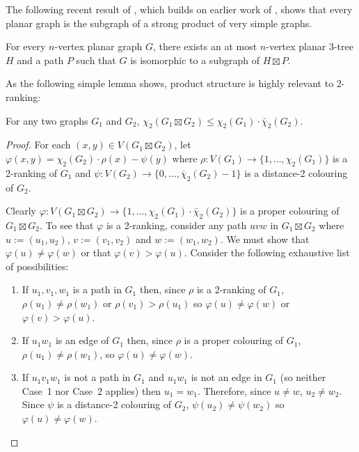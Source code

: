 \documentclass[kpfonts]{patmorin}
\newcommand{\trn}{\chi_2}
\newcommand{\dtcn}{\bar{\chi}_2}
\theoremstyle{named}
\begin{document}
The following recent result of \citet{dujmovic.joret.ea:planar}, which builds on earlier work of \citet{pilipczuk.siebertz:polynomial}, shows that every planar graph is the subgraph of a strong product of very simple graphs.

\begin{thm}\cite{dujmovic.joret.ea:planar}\label{product-structure}
    For every $n$-vertex planar graph $G$, there exists an at most $n$-vertex planar 3-tree $H$ and a path $P$ such that $G$ is isomorphic to a subgraph of $H\boxtimes P$.
\end{thm}

As the following simple lemma shows, product structure is highly relevant to 2-ranking:

\begin{lem}\label{product-lemma}
    For any two graphs $G_1$ and $G_2$, $\trn(G_1\boxtimes G_2)\le \trn(G_1)\cdot\dtcn(G_2)$.
\end{lem}

\begin{proof}
    For each $(x,y)\in V(G_1\boxtimes G_2)$, let $\varphi(x,y)=\trn(G_2)\cdot \rho(x) - \psi(y)$ where $\rho:V(G_1)\to\{1,\ldots,\trn(G_1)\}$ is a 2-ranking of $G_1$ and $\psi:V(G_2)\to\{0,\ldots,\dtcn(G_2)-1\}$ is a distance-2 colouring of $G_2$.

    Clearly $\varphi:V(G_1\boxtimes G_2)\to \{1,\ldots,\trn(G_1)\cdot\dtcn(G_2)\}$ is a proper colouring of $G_1\boxtimes G_2$.  To see that $\varphi$ is a 2-ranking, consider any path $uvw$ in $G_1\boxtimes G_2$ where $u:=(u_1,u_2)$, $v:=(v_1,v_2)$ and $w:=(w_1,w_2)$.  We must show that $\varphi(u)\neq\varphi(w)$ or that $\varphi(v)>\varphi(u)$.  Consider the following exhaustive list of possibilities:
    \begin{enumerate}
        \item If $u_1,v_1,w_1$ is a path in $G_1$ then, since $\rho$ is a 2-ranking of $G_1$, $\rho(u_1)\neq\rho(w_1)$ or $\rho(v_1)>\rho(u_1)$ so $\varphi(u)\neq \varphi(w)$ or $\varphi(v)>\varphi(u)$.

        \item If $u_1w_1$ is an edge of $G_1$ then, since $\rho$ is a proper colouring of $G_1$, $\rho(u_1)\neq\rho(w_1)$, so $\varphi(u)\neq\varphi(w)$.

        \item If $u_1v_1w_1$ is not a path in $G_1$ and $u_1w_1$ is not an edge in $G_1$ (so neither Case~1 nor Case~2 applies) then $u_1=w_1$.  Therefore, since $u\neq w$, $u_2\neq w_2$. Since $\psi$ is a distance-2 colouring of $G_2$, $\psi(u_2)\neq\psi(w_2)$ so $\varphi(u)\neq\varphi(w)$.
         \qedhere
    \end{enumerate}
\end{proof}
\end{document}
